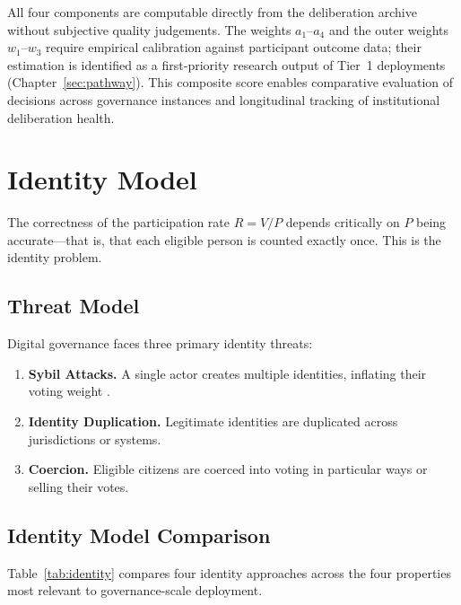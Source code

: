 \documentclass[12pt,a4paper,oneside]{report}
\begin{document}
All four components are computable directly from the deliberation archive without subjective quality judgements. The weights $a_1$--$a_4$ and the outer weights $w_1$--$w_3$ require empirical calibration against participant outcome data; their estimation is identified as a first-priority research output of Tier~1 deployments (Chapter~\ref{sec:pathway}). This composite score enables comparative evaluation of decisions across governance instances and longitudinal tracking of institutional deliberation health.

\chapter{Identity Model}
\label{sec:identity}

The correctness of the participation rate $R = V/P$ depends critically on $P$ being accurate---that is, that each eligible person is counted exactly once. This is the identity problem.

\section{Threat Model}

Digital governance faces three primary identity threats:

\begin{enumerate}
  \item \textbf{Sybil Attacks.} A single actor creates multiple identities, inflating their voting weight \citep{douceur2002sybil}.
  \item \textbf{Identity Duplication.} Legitimate identities are duplicated across jurisdictions or systems.
  \item \textbf{Coercion.} Eligible citizens are coerced into voting in particular ways or selling their votes.
\end{enumerate}

\section{Identity Model Comparison}

Table~\ref{tab:identity} compares four identity approaches across the four properties most relevant to governance-scale deployment.
\end{document}
